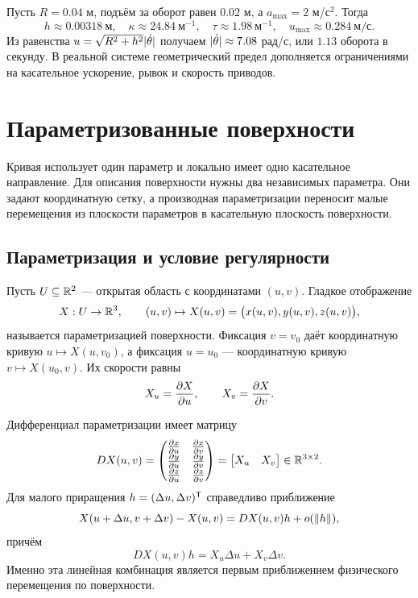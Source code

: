 Пусть \(R=0.04\) м, подъём за оборот равен \(0.02\) м, а \(a_{\max}=2\) м/с\(^2\). Тогда
\[
h\approx0.00318\ \text{м},
\quad
\kappa\approx24.84\ \text{м}^{-1},
\quad
\tau\approx1.98\ \text{м}^{-1},
\quad
u_{\max}\approx0.284\ \text{м/с}.
\]
Из равенства \(u=\sqrt{R^2+h^2}\lvert\dot\theta\rvert\) получаем \(\lvert\dot\theta\rvert\approx7.08\) рад/с, или \(1.13\) оборота в секунду. В реальной системе геометрический предел дополняется ограничениями на касательное ускорение, рывок и скорость приводов.

\section{Параметризованные поверхности}
\label{sec:parametric-surfaces}

Кривая использует один параметр и локально имеет одно касательное направление. Для описания поверхности нужны два независимых параметра. Они задают координатную сетку, а производная параметризации переносит малые перемещения из плоскости параметров в касательную плоскость поверхности.

\subsection{Параметризация и условие регулярности}

Пусть \(U\subseteq\mathbb{R}^2\) --- открытая область с координатами \((u,v)\). Гладкое отображение
\begin{equation}
\label{eq:surface-parameterization}
X:U\to\mathbb{R}^3,
\qquad
(u,v)\mapsto X(u,v)
=\bigl(x(u,v),y(u,v),z(u,v)\bigr),
\end{equation}
называется параметризацией поверхности. Фиксация \(v=v_0\) даёт координатную кривую \(u\mapsto X(u,v_0)\), а фиксация \(u=u_0\) --- координатную кривую \(v\mapsto X(u_0,v)\). Их скорости равны
\[
X_u=\frac{\partial X}{\partial u},
\qquad
X_v=\frac{\partial X}{\partial v}.
\]

Дифференциал параметризации имеет матрицу
\begin{equation}
\label{eq:surface-jacobian}
D X(u,v)
=
\begin{pmatrix}
\frac{\partial x}{\partial u} & \frac{\partial x}{\partial v}\\
\frac{\partial y}{\partial u} & \frac{\partial y}{\partial v}\\
\frac{\partial z}{\partial u} & \frac{\partial z}{\partial v}
\end{pmatrix}
=
\begin{bmatrix}X_u&X_v\end{bmatrix}
\in\mathbb{R}^{3\times2}.
\end{equation}
Для малого приращения \(h=(\Delta u,\Delta v)^{\mathsf{T}}\) справедливо приближение
\begin{equation}
\label{eq:surface-linearization}
X(u+\Delta u,v+\Delta v)-X(u,v)
=D X(u,v)h+o(\lVert h\rVert),
\end{equation}
причём
\[
D X(u,v)h=X_u\Delta u+X_v\Delta v.
\]
Именно эта линейная комбинация является первым приближением физического перемещения по поверхности.

